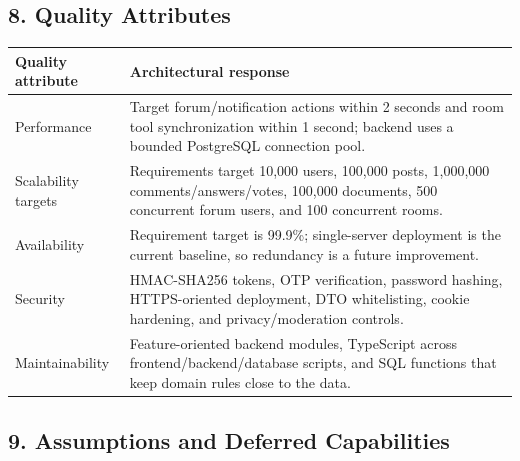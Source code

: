 \documentclass[12pt]{article}
\renewcommand{\baselinestretch}{1.5}
\begin{document}
\hypertarget{sec:8-quality-attributes}{}
\subsection*{8. Quality Attributes}
\par\medskip

\begingroup
\small
\renewcommand{\baselinestretch}{1.0}\selectfont
\renewcommand{\arraystretch}{1.15}
\setlength{\tabcolsep}{6pt}
\begin{longtable}{|>{\raggedright\arraybackslash}p{}|>{\raggedright\arraybackslash}p{}|}
\hline
\textbf{Quality attribute} & \textbf{Architectural response} \\ \hline
\endhead
Performance & Target forum/notification actions within 2 seconds and room tool synchronization within 1 second; backend uses a bounded PostgreSQL connection pool. \\ \hline
Scalability targets & Requirements target 10,000 users, 100,000 posts, 1,000,000 comments/answers/votes, 100,000 documents, 500 concurrent forum users, and 100 concurrent rooms. \\ \hline
Availability & Requirement target is 99.9\%; single-server deployment is the current baseline, so redundancy is a future improvement. \\ \hline
Security & HMAC-SHA256 tokens, OTP verification, password hashing, HTTPS-oriented deployment, DTO whitelisting, cookie hardening, and privacy/moderation controls. \\ \hline
Maintainability & Feature-oriented backend modules, TypeScript across frontend/backend/database scripts, and SQL functions that keep domain rules close to the data. \\ \hline
\end{longtable}
\endgroup
\par\medskip

\hypertarget{sec:9-assumptions-and-deferred-capabilities}{}
\subsection*{9. Assumptions and Deferred Capabilities}
\par\medskip
\end{document}
